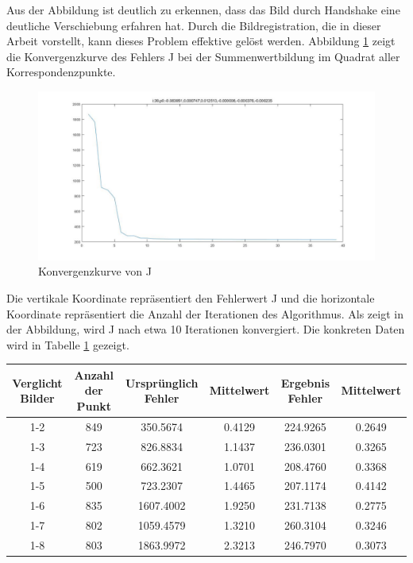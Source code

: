 Aus der Abbildung ist deutlich zu erkennen, dass das Bild durch Handshake eine deutliche Verschiebung erfahren hat. Durch die Bildregistration, die in dieser Arbeit vorstellt, kann dieses Problem effektive gelöst werden. Abbildung \ref{fig:Konvergenzkurve} zeigt die Konvergenzkurve des Fehlers J bei der Summenwertbildung im Quadrat aller Korrespondenzpunkte.

\begin{figure}[H]
 \centering 
  \includegraphics[keepaspectratio,width=1.0\textwidth]{images/6_Auswertung/J8.pdf}
 \caption{Konvergenzkurve von J}
 \label{fig:Konvergenzkurve}
\end{figure}

Die vertikale Koordinate repräsentiert den Fehlerwert J und die horizontale Koordinate repräsentiert die Anzahl der Iterationen des Algorithmus. Als zeigt in der Abbildung, wird J nach etwa 10 Iterationen konvergiert. Die konkreten Daten wird in Tabelle \ref{tbl:Daten des Fehlers} gezeigt.

\begin{table}[htb]
	\label{tbl:Daten des Fehlers}
	\footnotesize
	\centering
	\begin{tabular}{|c|c|c|c|c|c|}
	\toprule
	\textbf{Verglicht Bilder} & \textbf{Anzahl der Punkt} & \textbf{Ursprünglich Fehler} & \textbf{Mittelwert} &\textbf{Ergebnis Fehler} & \textbf{Mittelwert}\\
	\midrule
	1-2 & 849 & 350.5674 & 0.4129 & 224.9265 & 0.2649\\ 
	1-3 & 723 & 826.8834 & 1.1437 & 236.0301 & 0.3265\\ 
	1-4 & 619 & 662.3621 & 1.0701 & 208.4760 & 0.3368\\ 
	1-5 & 500 & 723.2307 & 1.4465 & 207.1174 & 0.4142\\ 
	1-6 & 835 & 1607.4002 & 1.9250& 231.7138 & 0.2775\\ 
	1-7 & 802 & 1059.4579 & 1.3210& 260.3104 & 0.3246\\ 
	1-8 & 803 & 1863.9972 & 2.3213& 246.7970 & 0.3073\\ 
	\bottomrule
	\end{tabular}
\end{table} 

